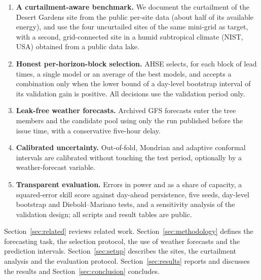 \begin{enumerate}
  \item \textbf{A curtailment-aware benchmark.} We document the curtailment of the Desert Gardens
  site from the public per-site data (about half of its available energy), and use the four
  uncurtailed sites of the same mini-grid as target, with a second, grid-connected site in a
  humid subtropical climate (NIST, USA) obtained from a public data lake.

  \item \textbf{Honest per-horizon-block selection.} AHSE selects, for each block of lead times,
  a single model or an average of the best models, and accepts a combination only when the lower
  bound of a day-level bootstrap interval of its validation gain is positive. All decisions use
  the validation period only.

  \item \textbf{Leak-free weather forecasts.} Archived GFS forecasts enter the tree members and
  the candidate pool using only the run published before the issue time, with a conservative
  five-hour delay.

  \item \textbf{Calibrated uncertainty.} Out-of-fold, Mondrian and adaptive conformal intervals
  are calibrated without touching the test period, optionally by a weather-forecast variable.

  \item \textbf{Transparent evaluation.} Errors in power and as a share of capacity, a
  squared-error skill score against day-ahead persistence, five seeds, day-level bootstrap and
  Diebold--Mariano tests, and a sensitivity analysis of the validation design; all scripts and
  result tables are public.
\end{enumerate}

Section~\ref{sec:related} reviews related work. Section~\ref{sec:methodology} defines the
forecasting task, the selection protocol, the use of weather forecasts and the prediction
intervals. Section~\ref{sec:setup} describes the sites, the curtailment analysis and the
evaluation protocol. Section~\ref{sec:results} reports and discusses the results and
Section~\ref{sec:conclusion} concludes.
